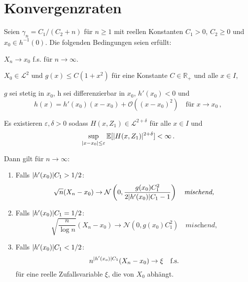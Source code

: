 \documentclass[ngerman,a4paper,11pt]{scrartcl}
\newcommand{\EE}{\mathbb{E}}
\newcommand{\RR}{\mathbb{R}}
\renewcommand{\ll}{\mathcal{L}}
\newcommand{\nn}{\mathcal{N}}
\newcommand{\expect}[1]{\EE[#1]}
\DeclarePairedDelimiter{\abs}{\lvert}{\rvert}		%
\begin{document}
\section{Konvergenzraten}
\begin{thm}
 \label{thm:haupt}
 Seien $\gamma_n=C_1/(C_2+n)$ für $n\geq 1$ mit reellen Konstanten $C_1>0$,
 $C_2\geq 0$ und $x_0\in h^{-1}(0)$. Die folgenden Bedingungen seien erfüllt:
 \begin{thmasslist}
 \item $X_n\to x_0$ f.s. für $n\to\infty$.
 \item $X_0\in\ll^2$ und $g(x)\leq C(1+x^2)$ für eine Konstante $C\in\RR_+$ und
   alle $x\in I$,\label{thm:haupt:b}
 \item $g$ sei stetig in $x_0$, h sei differenzierbar in $x_0$, $h'(x_0)<0$ und\label{thm:haupt:c}
   \begin{equation*}
    h(x) = h'(x_0)(x-x_0) + \mathcal{O}((x-x_0)^2)\quad\text{für $x\to x_0$}\,,
   \end{equation*}
 \item Es existieren $\varepsilon,\delta >0$ sodass $H(x,Z_1)\in\ll^{2+\delta}$ für
   alle $x\in I$ und 
   \begin{equation*}
    \sup_{\abs{x-x_0}\leq\varepsilon}\expect{\abs{H(x,Z_1)}^{2+\delta}}<\infty\,.
   \end{equation*}
 \end{thmasslist}
 Dann gilt für $n\to\infty$:
 \begin{enumerate}[label=(\roman*)]
 \item Falls $\abs{h'(x_0)}C_1>1/2$:\label{thm:haupt:i}
   \begin{equation*}
    \sqrt{n}(X_n-x_0)\to\nn\left( 0,\frac{g(x_0)C_1^2}{2\abs{h'(x_0)}C_1-1} \right)\quad\textit{mischend,}
   \end{equation*}
 \item Falls $\abs{h'(x_0)}C_1=1/2$:
   \begin{equation*}
    \sqrt{\frac{n}{\log n}}(X_n-x_0)\to\nn\left( 0,g(x_0)C_1^2 \right)\quad\textit{mischend,}
   \end{equation*}
 \item Falls $\abs{h'(x_0)}C_1<1/2$: 
   \begin{equation*}
     n^{\abs{h'(x_o)}C_1}(X_n-x_0)\to\xi \quad\text{f.s.}
   \end{equation*}
   für eine reelle Zufallsvariable $\xi$, die von $X_0$ abhängt.
 \end{enumerate}
\end{thm}
\end{document}
